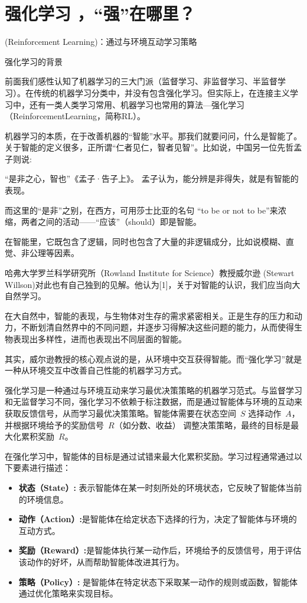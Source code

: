 \chapter{强化学习 ，“强”在哪里？}
(Reinforcement Learning)：通过与环境互动学习策略


 强化学习的背景
 
前面我们感性认知了机器学习的三大门派（监督学习、非监督学习、半监督学习）。在传统的机器学习分类中，并没有包含强化学习。但实际上，在连接主义学习中，还有一类人类学习常用、机器学习也常用的算法—强化学习（ReinforcementLearning，简称RL）。

机器学习的本质，在于改善机器的“智能”水平。那我们就要问问，什么是智能了。关于智能的定义很多，正所谓“仁者见仁，智者见智”。比如说，中国另一位先哲孟子则说:

“是非之心，智也”《孟子·告子上》。
孟子认为，能分辨是非得失，就是有智能的表现。

而这里的“是非”之别，在西方，可用莎士比亚的名句 “to be or not to be”来浓缩，两者之间的活动——“应该”（should）即是智能。

在智能里，它既包含了逻辑，同时也包含了大量的非逻辑成分，比如说模糊、直觉、非公理等因素。

哈弗大学罗兰科学研究所（Rowland Institute for Science）教授威尔逊 (Stewart Willson)对此也有自己独到的见解。他认为[1]，关于对智能的认识，我们应当向大自然学习。

在大自然中，智能的表现，与生物体对生存的需求紧密相关。正是生存的压力和动力，不断划清自然界中的不同问题，并逐步习得解决这些问题的能力，从而使得生物表现出多样性，进而也表现出不同层面的智能。

其实，威尔逊教授的核心观点说的是，从环境中交互获得智能。而“强化学习”就是一种从环境交互中改善自己性能的机器学习方式。


强化学习是一种通过与环境互动来学习最优决策策略的机器学习范式。与监督学习和无监督学习不同，强化学习不依赖于标注数据，而是通过智能体与环境的互动来获取反馈信号，从而学习最优决策策略。智能体需要在状态空间~$S$ 选择动作~$A$，并根据环境给予的奖励信号~$R$（如分数、收益） 调整决策策略，最终的目标是最大化累积奖励~$R$。

在强化学习中，智能体的目标是通过试错来最大化累积奖励。学习过程通常通过以下要素进行描述：
\begin{itemize}
\item {\bf 状态（State）:} 表示智能体在某一时刻所处的环境状态，它反映了智能体当前的环境信息。
\item {\bf  动作（Action）:}是智能体在给定状态下选择的行为，决定了智能体与环境的互动方式。
\item {\bf 奖励（Reward）:}是智能体执行某一动作后，环境给予的反馈信号，用于评估该动作的好坏，从而帮助智能体改进其行为。
\item {\bf  策略（Policy）:} 是智能体在特定状态下采取某一动作的规则或函数，智能体通过优化策略来实现目标。
\end{itemize}

